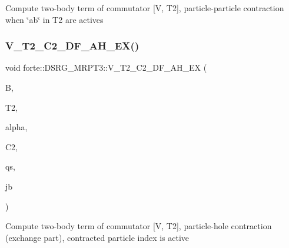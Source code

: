 Compute two-\/body term of commutator \mbox{[}V, T2\mbox{]}, particle-\/particle contraction when \char`\"{}ab\char`\"{} in T2 are actives \mbox{\label{classforte_1_1_d_s_r_g___m_r_p_t3_a2beafc4ba36ddc0c27557c0c858fbf85}} 
\subsubsection{\texorpdfstring{V\+\_\+\+T2\+\_\+\+C2\+\_\+\+D\+F\+\_\+\+A\+H\+\_\+\+E\+X()}{V\_T2\_C2\_DF\_AH\_EX()}}
{\footnotesize\ttfamily void forte\+::\+D\+S\+R\+G\+\_\+\+M\+R\+P\+T3\+::\+V\+\_\+\+T2\+\_\+\+C2\+\_\+\+D\+F\+\_\+\+A\+H\+\_\+\+EX (\begin{DoxyParamCaption}\item[{Blocked\+Tensor \&}]{B,  }\item[{Blocked\+Tensor \&}]{T2,  }\item[{const double \&}]{alpha,  }\item[{Blocked\+Tensor \&}]{C2,  }\item[{const std\+::vector$<$ std\+::vector$<$ std\+::string $>$$>$ \&}]{qs,  }\item[{const std\+::vector$<$ std\+::vector$<$ std\+::string $>$$>$ \&}]{jb }\end{DoxyParamCaption})\hspace{0.3cm}{\ttfamily [protected]}}

Compute two-\/body term of commutator \mbox{[}V, T2\mbox{]}, particle-\/hole contraction (exchange part), contracted particle index is active \mbox{\label{classforte_1_1_d_s_r_g___m_r_p_t3_a91c900ea22e66c97bb0db18c8f49e8cb}} 

